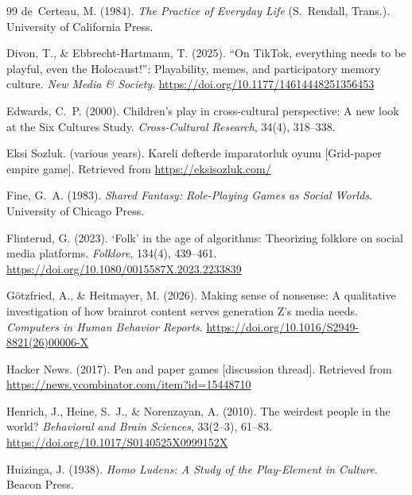 \documentclass[12pt]{article}
\begin{document}
\begin{thebibliography}{99}
de~Certeau, M. (1984).
\newblock \emph{The Practice of Everyday Life} (S.~Rendall, Trans.).
\newblock University of California Press.

Divon, T., \& Ebbrecht-Hartmann, T. (2025).
\newblock ``On TikTok, everything needs to be playful, even the Holocaust!'': Playability, memes, and participatory memory culture.
\newblock \emph{New Media \& Society}.
\newblock \url{https://doi.org/10.1177/14614448251356453}

Edwards, C.~P. (2000).
\newblock Children's play in cross-cultural perspective: A new look at the Six Cultures Study.
\newblock \emph{Cross-Cultural Research}, 34(4), 318--338.

Eksi Sozluk. (various years).
\newblock Kareli defterde imparatorluk oyunu [Grid-paper empire game].
\newblock Retrieved from \url{https://eksisozluk.com/}

Fine, G.~A. (1983).
\newblock \emph{Shared Fantasy: Role-Playing Games as Social Worlds}.
\newblock University of Chicago Press.

Flinterud, G. (2023).
\newblock `Folk' in the age of algorithms: Theorizing folklore on social media platforms.
\newblock \emph{Folklore}, 134(4), 439--461.
\newblock \url{https://doi.org/10.1080/0015587X.2023.2233839}

G\"{o}tzfried, A., \& Heitmayer, M. (2026).
\newblock Making sense of nonsense: A qualitative investigation of how brainrot content serves generation Z's media needs.
\newblock \emph{Computers in Human Behavior Reports}.
\newblock \url{https://doi.org/10.1016/S2949-8821(26)00006-X}

Hacker News. (2017).
\newblock Pen and paper games [discussion thread].
\newblock Retrieved from \url{https://news.ycombinator.com/item?id=15448710}

Henrich, J., Heine, S.~J., \& Norenzayan, A. (2010).
\newblock The weirdest people in the world?
\newblock \emph{Behavioral and Brain Sciences}, 33(2--3), 61--83.
\newblock \url{https://doi.org/10.1017/S0140525X0999152X}

Huizinga, J. (1938).
\newblock \emph{Homo Ludens: A Study of the Play-Element in Culture}.
\newblock Beacon Press.


\end{thebibliography}
\end{document}
